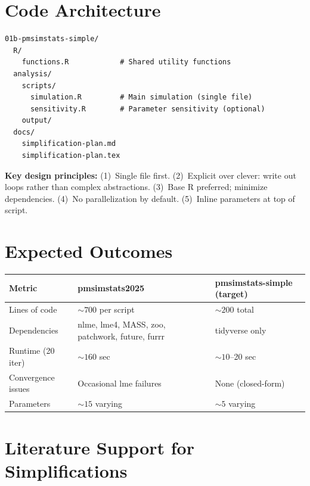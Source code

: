 \documentclass[11pt,letterpaper]{article}
\begin{document}
\section{Code Architecture}

\begin{Verbatim}[fontsize=\small]
01b-pmsimstats-simple/
  R/
    functions.R            # Shared utility functions
  analysis/
    scripts/
      simulation.R         # Main simulation (single file)
      sensitivity.R        # Parameter sensitivity (optional)
    output/
  docs/
    simplification-plan.md
    simplification-plan.tex
\end{Verbatim}

\textbf{Key design principles:}
(1)~Single file first.
(2)~Explicit over clever: write out loops rather than complex
abstractions.
(3)~Base R preferred; minimize dependencies.
(4)~No parallelization by default.
(5)~Inline parameters at top of script.


\section{Expected Outcomes}

\begin{table}[h]
\centering
\begin{tabular}{@{}lll@{}}
\toprule
Metric & pmsimstats2025 & pmsimstats-simple (target) \\
\midrule
Lines of code & ${\sim}700$ per script & ${\sim}200$ total \\
Dependencies & nlme, lme4, MASS, zoo, patchwork, future, furrr & tidyverse only \\
Runtime (20 iter) & ${\sim}160$ sec & ${\sim}10$--20 sec \\
Convergence issues & Occasional lme failures & None (closed-form) \\
Parameters & ${\sim}15$ varying & ${\sim}5$ varying \\
\bottomrule
\end{tabular}
\end{table}


\section{Literature Support for Simplifications}
\end{document}
